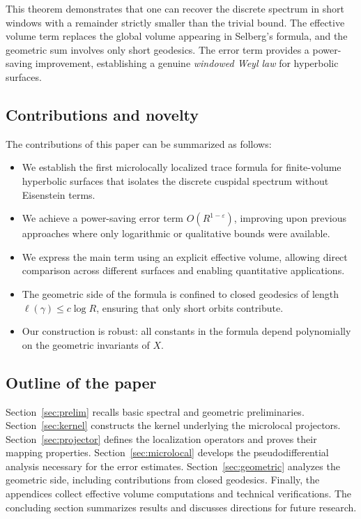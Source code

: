 This theorem demonstrates that one can recover the discrete spectrum in short windows with a remainder strictly smaller than the trivial bound. 
The effective volume term replaces the global volume appearing in Selberg’s formula, and the geometric sum involves only short geodesics. 
The error term provides a power-saving improvement, establishing a genuine \emph{windowed Weyl law} for hyperbolic surfaces.

\subsection{Contributions and novelty}
The contributions of this paper can be summarized as follows:
\begin{itemize}
  \item We establish the first microlocally localized trace formula for finite-volume hyperbolic surfaces that isolates the discrete cuspidal spectrum without Eisenstein terms.
  \item We achieve a power-saving error term $O(R^{1-\varepsilon})$, improving upon previous approaches where only logarithmic or qualitative bounds were available.
  \item We express the main term using an explicit effective volume, allowing direct comparison across different surfaces and enabling quantitative applications.
  \item The geometric side of the formula is confined to closed geodesics of length $\ell(\gamma)\leq c\log R$, ensuring that only short orbits contribute.
  \item Our construction is robust: all constants in the formula depend polynomially on the geometric invariants of $X$.
\end{itemize}

\subsection{Outline of the paper}
Section~\ref{sec:prelim} recalls basic spectral and geometric preliminaries. 
Section~\ref{sec:kernel} constructs the kernel underlying the microlocal projectors. 
Section~\ref{sec:projector} defines the localization operators and proves their mapping properties. 
Section~\ref{sec:microlocal} develops the pseudodifferential analysis necessary for the error estimates. 
Section~\ref{sec:geometric} analyzes the geometric side, including contributions from closed geodesics. 
Finally, the appendices collect effective volume computations and technical verifications. 
The concluding section summarizes results and discusses directions for future research.
